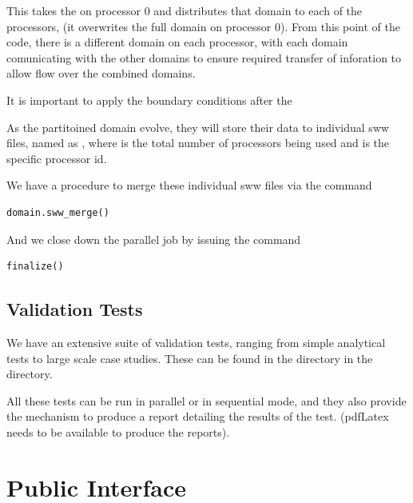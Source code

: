\documentclass{manual}
\begin{document}
This takes the  on processor 0 and distributes that domain to each of the processors, (it overwrites the full domain on processor 0).  From this point of the code, there is a different domain on each processor, with each domain comunicating with the other domains to ensure required transfer of inforation to allow flow over the combined domains. 

It is important to apply the boundary conditions after the 



As the partitoined domain evolve, they will store their data to individual sww files, named as , where  is the total number of processors being used and  is the specific processor id. 

We have a procedure to merge these individual sww files via the command 

\begin{verbatim}
domain.sww_merge()
\end{verbatim}

And we close down the parallel job by issuing the command 

\begin{verbatim}
finalize()
\end{verbatim}



\section{Validation Tests}

We have an extensive suite of validation tests, ranging from simple analytical tests to large scale case studies. These can be found in the  directory in the  directory. 

All these tests can be run in parallel or in sequential mode, and they also provide the mechanism to produce a report detailing the results of the test. (pdfLatex needs to be available to produce the reports). 




\chapter{\anuga Public Interface}
\label{ch:interface}
\end{document}
